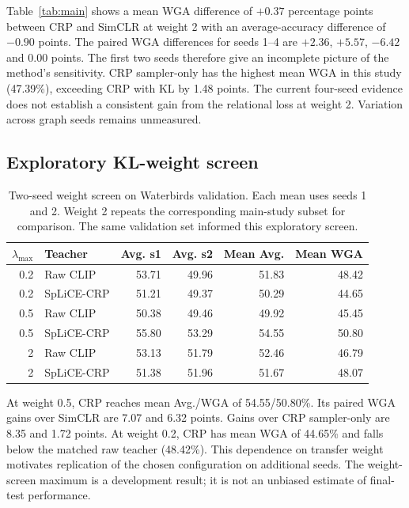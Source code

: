 \documentclass[11pt,a4paper]{article}
\begin{document}
Table~\ref{tab:main} shows a mean WGA difference of $+0.37$ percentage points
between CRP and SimCLR at weight 2 with an average-accuracy difference of
$-0.90$ points. The paired WGA differences for seeds 1--4 are $+2.36$, $+5.57$,
$-6.42$ and $0.00$ points. The first two seeds therefore give an incomplete
picture of the method's sensitivity. CRP sampler-only has the highest mean
WGA in this study (47.39\%), exceeding CRP with KL by 1.48 points. The current
four-seed evidence does not establish a consistent gain from the relational
loss at weight 2. Variation across graph seeds remains unmeasured.

\subsection{Exploratory KL-weight screen}
\begin{table}[t]
\centering
\caption{Two-seed weight screen on Waterbirds validation. Each mean uses seeds
1 and 2. Weight 2 repeats the corresponding main-study subset for comparison.
The same validation set informed this exploratory screen.}
\begin{tabular}{rlrrrr}
\toprule
$\lambda_{\max}$ & Teacher & Avg. s1 & Avg. s2 & Mean Avg. & Mean WGA \\
\midrule
0.2 & Raw CLIP & 53.71 & 49.96 & 51.83 & 48.42 \\
0.2 & SpLiCE-CRP & 51.21 & 49.37 & 50.29 & 44.65 \\
0.5 & Raw CLIP & 50.38 & 49.46 & 49.92 & 45.45 \\
0.5 & SpLiCE-CRP & 55.80 & 53.29 & 54.55 & 50.80 \\
2 & Raw CLIP & 53.13 & 51.79 & 52.46 & 46.79 \\
2 & SpLiCE-CRP & 51.38 & 51.96 & 51.67 & 48.07 \\
\bottomrule
\end{tabular}
\label{tab:weights}
\end{table}

At weight 0.5, CRP reaches mean Avg./WGA of 54.55/50.80\%. Its paired WGA gains
over SimCLR are 7.07 and 6.32 points. Gains over CRP sampler-only are 8.35 and
1.72 points. At weight 0.2, CRP has mean WGA of 44.65\% and falls below the
matched raw teacher (48.42\%). This dependence on transfer weight motivates
replication of the chosen configuration on additional seeds. The weight-screen
maximum is a development result; it is not an unbiased estimate of final-test
performance.
\end{document}
